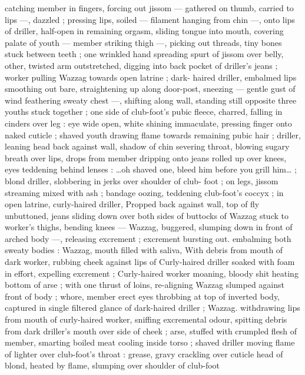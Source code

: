 catching member in fingers, forcing out jissom --- gathered on 
thumb, carried to lips ---, dazzled ; pressing lips, soiled --- filament 
hanging from chin ---, onto lips of driller, half-open in remaining 
orgasm, sliding tongue into mouth, covering palate of youth --- 
member striking thigh ---, picking out threads, tiny bones stuck 
between teeth ; one wrinkled hand spreading spurt of jissom over 
belly, other, twisted arm outstretched, digging into back pocket of 
driller's jeans ; worker pulling Wazzag towards open latrine ; dark- 
haired driller, embalmed lips smoothing out bare, straightening up 
along door-post, sneezing --- gentle gust of wind feathering sweaty 
chest ---, shifting along wall, standing still opposite three youths 
stuck together ; one side of club-foot's pubic fleece, charred, falling 
in cinders over leg : eye wide open, white shining immaculate, 
pressing finger onto naked cuticle ; shaved youth drawing flame 
towards remaining pubic hair ; driller, leaning head back against wall, 
shadow of chin severing throat, blowing sugary breath over lips, 
drops from member dripping onto jeans rolled up over knees, eyes 
teddening behind lenses : {\gl}{\ldots}oh shaved one, bleed him before you 
grill him{\ldots}{\gr} ; blond driller, slobbering in jerks over shoulder of club- 
foot ; on legs, jissom streaming mixed with ash ; bandage oozing, 
teddening club-foot's coccyx ; in open latrine, curly-haired driller, 
Propped back against wall, top of fly unbuttoned, jeans sliding down 
over both sides of buttocks of Wazzag stuck to worker's thighs, 
bending knees --- Wazzag, buggered, slumping down in front of 
arched body ---, releasing excrement ; excrement bursting out. 
embalming both sweaty bodies : Wazzag, mouth filled with saliva, 
With debris from mouth of dark worker, rubbing cheek against lips of 
Curly-haired driller soaked with foam in effort, expelling excrement ; 
Curly-haired worker moaning, bloody shit heating bottom of arse ; 
with one thrust of loins, re-aligning Wazzag slumped against front of 
body ; whore, member erect eyes throbbing at top of inverted body, 
captured in single filtered glance of dark-haired driller ; Wazzag. 
withdrawing lips from mouth of curly-haired worker, sniffing 
excremental odour, spitting debris from dark driller's mouth over side 
of cheek ; arse, stuffed with crumpled flesh of member, smarting 
boiled meat cooling inside torso ; shaved driller moving flame of 
lighter over club-foot's throat : grease, gravy crackling over cuticle 
head of blond, heated by flame, slumping over shoulder of club-foot 
